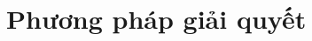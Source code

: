 
\chapter{Phương pháp giải quyết} %



\ifpdf
    \graphicspath{{X/figures/PNG/}{X/figures/PDF/}{X/figures/}}
\else
    \graphicspath{{X/figures/EPS/}{X/figures/}}
\fi









